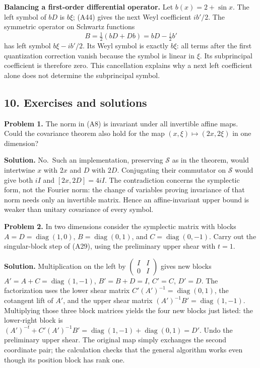 \documentclass[
  11pt,
]{article}
\begin{document}
\textbf{Balancing a first-order differential operator.} Let
\(b(x)=2+\sin x\). The left symbol of \(bD\) is \(b\xi\); (A44) gives
the next Weyl coefficient \(ib'/2\). The symmetric operator on Schwartz
functions \[
B=\tfrac12(bD+Db)=bD-\tfrac i2b'
\tag{A49}
\] has left symbol \(b\xi-ib'/2\). Its Weyl symbol is exactly \(b\xi\):
all terms after the first quantization correction vanish because the
symbol is linear in \(\xi\). Its subprincipal coefficient is therefore
zero. This cancellation explains why a next left coefficient alone does
not determine the subprincipal symbol.

\subsection{10. Exercises and solutions}\label{exercises-and-solutions}

\textbf{Problem 1.} The norm in (A8) is invariant under all invertible
affine maps. Could the covariance theorem also hold for the map
\((x,\xi)\mapsto(2x,2\xi)\) in one dimension?

\textbf{Solution.} No.~Such an implementation, preserving \(\mathcal S\)
as in the theorem, would intertwine \(x\) with \(2x\) and \(D\) with
\(2D\). Conjugating their commutator on \(\mathcal S\) would give both
\(iI\) and \([2x,2D]=4iI\). The contradiction concerns the symplectic
form, not the Fourier norm: the change of variables proving invariance
of that norm needs only an invertible matrix. Hence an affine-invariant
upper bound is weaker than unitary covariance of every symbol.

\textbf{Problem 2.} In two dimensions consider the symplectic matrix
with blocks \(A=D=\operatorname{diag}(1,0)\),
\(B=\operatorname{diag}(0,1)\), and \(C=\operatorname{diag}(0,-1)\).
Carry out the singular-block step of (A29), using the preliminary upper
shear with \(t=1\).

\textbf{Solution.} Multiplication on the left by
\(\left(\begin{smallmatrix}I&I\\0&I\end{smallmatrix}\right)\) gives new
blocks \(A'=A+C=\operatorname{diag}(1,-1)\), \(B'=B+D=I\), \(C'=C\),
\(D'=D\). The factorization uses the lower shear matrix
\(C'(A')^{-1}=\operatorname{diag}(0,1)\), the cotangent lift of \(A'\),
and the upper shear matrix \((A')^{-1}B'=\operatorname{diag}(1,-1)\).
Multiplying those three block matrices yields the four new blocks just
listed: the lower-right block is
\((A')^{-t}+C'(A')^{-1}B'=\operatorname{diag}(1,-1)+\operatorname{diag}(0,1)=D'\).
Undo the preliminary upper shear. The original map simply exchanges the
second coordinate pair; the calculation checks that the general
algorithm works even though its position block has rank one.
\end{document}
